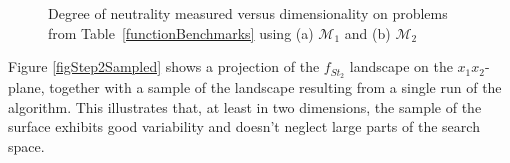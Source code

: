 \documentclass[conference]{IEEEtran}
\begin{document}
\begin{figure}[!ht]
	\centering
	\label{figNeutralityVsDimensionsM1}	
		
	\label{figNeutralityVsDimensionsM2}	
	\caption{Degree of neutrality measured versus dimensionality on problems from Table~\ref{functionBenchmarks} using (a) ${\mathcal{M}_1}$ and (b) ${\mathcal{M}_2}$ }
	\label{figNeutralityVsDimensions}
\end{figure}

Figure \ref{figStep2Sampled} shows a projection of the $f_{\textit{St}_2}$ landscape on the $x_1x_2$-plane, together with a sample of the landscape resulting from a single run of the algorithm. This illustrates that, at least in two dimensions, the sample of the surface exhibits good variability and doesn't neglect large parts of the search space.
\end{document}
